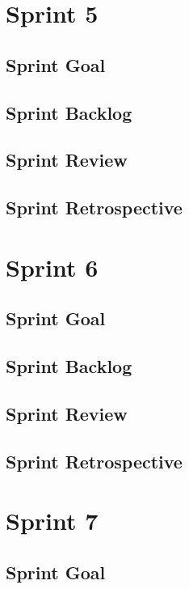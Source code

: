 \documentclass{report}
\begin{document}
    \chapter{Sprint 5}
    \section{Sprint Goal}
        
    \section{Sprint Backlog}
        
    \section{Sprint Review}
        
    \section{Sprint Retrospective}
        
        
    \chapter{Sprint 6}
    \section{Sprint Goal}
        
    \section{Sprint Backlog}
        
    \section{Sprint Review}
        
    \section{Sprint Retrospective}
        
        
    \chapter{Sprint 7}
    \section{Sprint Goal}
        
\end{document}
